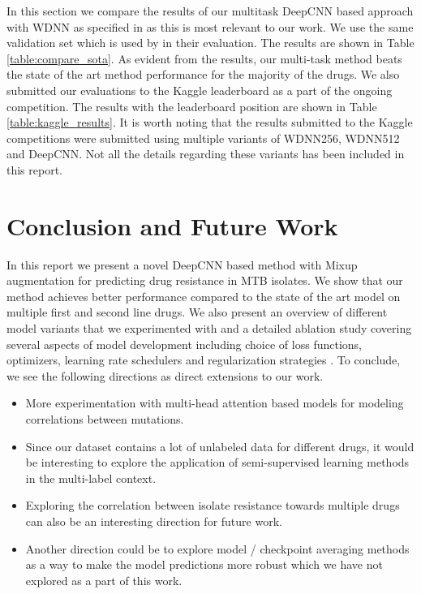 \documentclass{article}
\begin{document}
In this section we compare the results of our multitask DeepCNN based approach with WDNN as specified in \cite{CHEN2019356} as
this is most relevant to our work. We use the same validation set 
which is used by \cite{CHEN2019356} in their evaluation. The results are shown in Table \ref{table:compare_sota}. As evident
from the results, our multi-task method beats the state of the art method performance for the majority 
of the drugs. We also submitted our evaluations to the Kaggle leaderboard as a part of the ongoing
competition. The results with the leaderboard position are shown in Table \ref{table:kaggle_results}. It is worth
noting that the results submitted to the Kaggle competitions were submitted using multiple
variants of WDNN256, WDNN512 and DeepCNN. Not all the details regarding these variants has been included in this
report.

\section{Conclusion and Future Work}
\label{section:conclusion}
In this report we present a novel DeepCNN based method with Mixup augmentation
 for predicting drug resistance in MTB isolates. We show that our method achieves
better performance compared to the state of the art model on multiple first and 
second line drugs. We also
present an overview of different model variants that we experimented with and a 
detailed ablation study covering several aspects of model development including
choice of loss functions, optimizers, learning rate schedulers and regularization strategies
. To conclude,
we see the following directions as direct extensions to our work.
\begin{itemize}
  \item More experimentation with multi-head attention based models for modeling correlations
  between mutations.
  \item Since our dataset contains a lot of unlabeled data for different drugs, it would
  be interesting to explore the application of semi-supervised learning methods in 
  the multi-label context.
  \item Exploring the correlation between isolate resistance towards multiple drugs can also 
  be an interesting direction for future work.
  \item Another direction could be to explore model / checkpoint averaging methods
  as a way to make the model predictions more robust which we have not explored as a part
  of this work.
\end{itemize}
\end{document}
